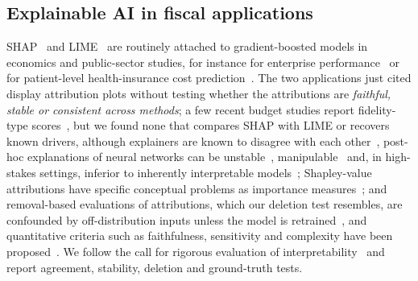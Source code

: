 \subsection{Explainable AI in fiscal applications}
SHAP~\cite{lundberg2017,lundberg2020} and LIME~\cite{ribeiro2016} are routinely attached to gradient-boosted models in economics and public-sector studies, for instance for enterprise performance~\cite{zhang2026} or for patient-level health-insurance cost prediction~\cite{yao2025}. The two applications just cited display attribution plots without testing whether the attributions are \emph{faithful, stable or consistent across methods}; a few recent budget studies report fidelity-type scores~\cite{francies2026,kisman2026}, but we found none that compares SHAP with LIME or recovers known drivers, although explainers are known to disagree with each other~\cite{krishna2022}, post-hoc explanations of neural networks can be unstable~\cite{alvarezmelis2018,ghorbani2019}, manipulable~\cite{slack2020} and, in high-stakes settings, inferior to inherently interpretable models~\cite{rudin2019}; Shapley-value attributions have specific conceptual problems as importance measures~\cite{kumar2020}; and removal-based evaluations of attributions, which our deletion test resembles, are confounded by off-distribution inputs unless the model is retrained~\cite{hooker2018}, and quantitative criteria such as faithfulness, sensitivity and complexity have been proposed~\cite{bhatt2020}. We follow the call for rigorous evaluation of interpretability~\cite{doshi2017} and report agreement, stability, deletion and ground-truth tests.

